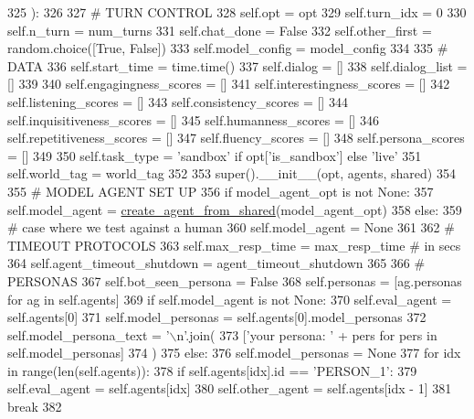 \begin{DoxyCode}
325     ):
326 
327         \textcolor{comment}{# TURN CONTROL}
328         self.opt = opt
329         self.turn\_idx = 0
330         self.n\_turn = num\_turns
331         self.chat\_done = \textcolor{keyword}{False}
332         self.other\_first = random.choice([\textcolor{keyword}{True}, \textcolor{keyword}{False}])
333         self.model\_config = model\_config
334 
335         \textcolor{comment}{# DATA}
336         self.start\_time = time.time()
337         self.dialog = []
338         self.dialog\_list = []
339 
340         self.engagingness\_scores = []
341         self.interestingness\_scores = []
342         self.listening\_scores = []
343         self.consistency\_scores = []
344         self.inquisitiveness\_scores = []
345         self.humanness\_scores = []
346         self.repetitiveness\_scores = []
347         self.fluency\_scores = []
348         self.persona\_scores = []
349 
350         self.task\_type = \textcolor{stringliteral}{'sandbox'} \textcolor{keywordflow}{if} opt[\textcolor{stringliteral}{'is\_sandbox'}] \textcolor{keywordflow}{else} \textcolor{stringliteral}{'live'}
351         self.world\_tag = world\_tag
352 
353         super().\_\_init\_\_(opt, agents, shared)
354 
355         \textcolor{comment}{# MODEL AGENT SET UP}
356         \textcolor{keywordflow}{if} model\_agent\_opt \textcolor{keywordflow}{is} \textcolor{keywordflow}{not} \textcolor{keywordtype}{None}:
357             self.model\_agent = \hyperlink{namespaceparlai_1_1core_1_1agents_aa5af5dd1d2f9da491b60348d479b849f}{create\_agent\_from\_shared}(model\_agent\_opt)
358         \textcolor{keywordflow}{else}:
359             \textcolor{comment}{# case where we test against a human}
360             self.model\_agent = \textcolor{keywordtype}{None}
361 
362         \textcolor{comment}{# TIMEOUT PROTOCOLS}
363         self.max\_resp\_time = max\_resp\_time  \textcolor{comment}{# in secs}
364         self.agent\_timeout\_shutdown = agent\_timeout\_shutdown
365 
366         \textcolor{comment}{# PERSONAS}
367         self.bot\_seen\_persona = \textcolor{keyword}{False}
368         self.personas = [ag.personas \textcolor{keywordflow}{for} ag \textcolor{keywordflow}{in} self.agents]
369         \textcolor{keywordflow}{if} self.model\_agent \textcolor{keywordflow}{is} \textcolor{keywordflow}{not} \textcolor{keywordtype}{None}:
370             self.eval\_agent = self.agents[0]
371             self.model\_personas = self.agents[0].model\_personas
372             self.model\_persona\_text = \textcolor{stringliteral}{'\(\backslash\)n'}.join(
373                 [\textcolor{stringliteral}{'your persona: '} + pers \textcolor{keywordflow}{for} pers \textcolor{keywordflow}{in} self.model\_personas]
374             )
375         \textcolor{keywordflow}{else}:
376             self.model\_personas = \textcolor{keywordtype}{None}
377             \textcolor{keywordflow}{for} idx \textcolor{keywordflow}{in} range(len(self.agents)):
378                 \textcolor{keywordflow}{if} self.agents[idx].id == \textcolor{stringliteral}{'PERSON\_1'}:
379                     self.eval\_agent = self.agents[idx]
380                     self.other\_agent = self.agents[idx - 1]
381                     \textcolor{keywordflow}{break}
382 
\end{DoxyCode}
